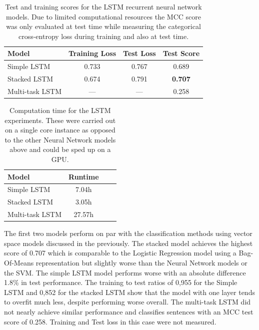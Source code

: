 \begin{table}[h]
  \begin{center}
    \begin{tabular}{ l c c c }
      \toprule
      Model & Training Loss & Test Loss & Test Score \\
      \midrule
      Simple LSTM & 0.733 & 0.767 & 0.689 \\
      Stacked LSTM & 0.674 & 0.791 & \textbf{0.707} \\
      Multi-task LSTM & --- & --- & 0.258 \\
      \bottomrule
    \end{tabular}
  \caption{Test and training scores for the LSTM recurrent neural network models. Due to limited computational resources the \gls{MCC} score was only evaluated at test time while measuring the categorical cross-entropy loss during training and also at test time.}
\label{tab:LSTM Results}
\end{center}
\end{table}

\begin{table}
  \centering
  \begin{center}
    \begin{tabular}{ l c c c }
      \toprule
      Model & Runtime \\
      \midrule
      Simple LSTM & 7.04h \\
      Stacked LSTM & 3.05h \\
      Multi-task LSTM & 27.57h \\
      \bottomrule
    \end{tabular}
    \caption{Computation time for the LSTM experiments. These were carried out on a single core instance as opposed to the other Neural Network models above and could be sped up on a \gls{GPU}.}
    \label{tab:Computation time LSTM}
  \end{center}
\end{table}
The first two models perform on par with the classification methods using vector space models discussed in the previously. The stacked model achieves the highest score of 0.707 which is comparable to the Logistic Regression model using a Bag-Of-Means representation but slightly worse than the Neural Network models or the SVM.
The simple LSTM model performs worse with an absolute difference 1.8\% in test performance. The training to test ratios of 0,955 for the Simple LSTM and 0,852 for the stacked LSTM show that the model with one layer tends to overfit much less, despite performing worse overall.
The multi-task LSTM did not nearly achieve similar performance and classifies sentences with an \gls{MCC} test score of 0.258. Training and Test loss in this case were not measured.

